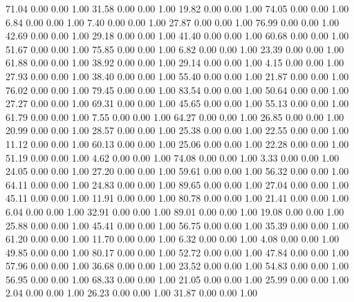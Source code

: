    71.04   0.00   0.00   1.00
   31.58   0.00   0.00   1.00
   19.82   0.00   0.00   1.00
   74.05   0.00   0.00   1.00
    6.84   0.00   0.00   1.00
    7.40   0.00   0.00   1.00
   27.87   0.00   0.00   1.00
   76.99   0.00   0.00   1.00
   42.69   0.00   0.00   1.00
   29.18   0.00   0.00   1.00
   41.40   0.00   0.00   1.00
   60.68   0.00   0.00   1.00
   51.67   0.00   0.00   1.00
   75.85   0.00   0.00   1.00
    6.82   0.00   0.00   1.00
   23.39   0.00   0.00   1.00
   61.88   0.00   0.00   1.00
   38.92   0.00   0.00   1.00
   29.14   0.00   0.00   1.00
    4.15   0.00   0.00   1.00
   27.93   0.00   0.00   1.00
   38.40   0.00   0.00   1.00
   55.40   0.00   0.00   1.00
   21.87   0.00   0.00   1.00
   76.02   0.00   0.00   1.00
   79.45   0.00   0.00   1.00
   83.54   0.00   0.00   1.00
   50.64   0.00   0.00   1.00
   27.27   0.00   0.00   1.00
   69.31   0.00   0.00   1.00
   45.65   0.00   0.00   1.00
   55.13   0.00   0.00   1.00
   61.79   0.00   0.00   1.00
    7.55   0.00   0.00   1.00
   64.27   0.00   0.00   1.00
   26.85   0.00   0.00   1.00
   20.99   0.00   0.00   1.00
   28.57   0.00   0.00   1.00
   25.38   0.00   0.00   1.00
   22.55   0.00   0.00   1.00
   11.12   0.00   0.00   1.00
   60.13   0.00   0.00   1.00
   25.06   0.00   0.00   1.00
   22.28   0.00   0.00   1.00
   51.19   0.00   0.00   1.00
    4.62   0.00   0.00   1.00
   74.08   0.00   0.00   1.00
    3.33   0.00   0.00   1.00
   24.05   0.00   0.00   1.00
   27.20   0.00   0.00   1.00
   59.61   0.00   0.00   1.00
   56.32   0.00   0.00   1.00
   64.11   0.00   0.00   1.00
   24.83   0.00   0.00   1.00
   89.65   0.00   0.00   1.00
   27.04   0.00   0.00   1.00
   45.11   0.00   0.00   1.00
   11.91   0.00   0.00   1.00
   80.78   0.00   0.00   1.00
   21.41   0.00   0.00   1.00
    6.04   0.00   0.00   1.00
   32.91   0.00   0.00   1.00
   89.01   0.00   0.00   1.00
   19.08   0.00   0.00   1.00
   25.88   0.00   0.00   1.00
   45.41   0.00   0.00   1.00
   56.75   0.00   0.00   1.00
   35.39   0.00   0.00   1.00
   61.20   0.00   0.00   1.00
   11.70   0.00   0.00   1.00
    6.32   0.00   0.00   1.00
    4.08   0.00   0.00   1.00
   49.85   0.00   0.00   1.00
   80.17   0.00   0.00   1.00
   52.72   0.00   0.00   1.00
   47.84   0.00   0.00   1.00
   57.96   0.00   0.00   1.00
   36.68   0.00   0.00   1.00
   23.52   0.00   0.00   1.00
   54.83   0.00   0.00   1.00
   56.95   0.00   0.00   1.00
   68.33   0.00   0.00   1.00
   21.05   0.00   0.00   1.00
   25.99   0.00   0.00   1.00
    2.04   0.00   0.00   1.00
   26.23   0.00   0.00   1.00
   31.87   0.00   0.00   1.00
